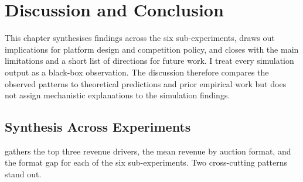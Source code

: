 \chapter{Discussion and Conclusion}
\label{ch:discussion}

This chapter synthesises findings across the six sub-experiments, draws out implications for platform design and competition policy, and closes with the main limitations and a short list of directions for future work. I treat every simulation output as a black-box observation. The discussion therefore compares the observed patterns to theoretical predictions and prior empirical work but does not assign mechanistic explanations to the simulation findings.

\section{Synthesis Across Experiments}
\label{sec:synthesis}

 gathers the top three revenue drivers, the mean revenue by auction format, and the format gap for each of the six sub-experiments. Two cross-cutting patterns stand out.

